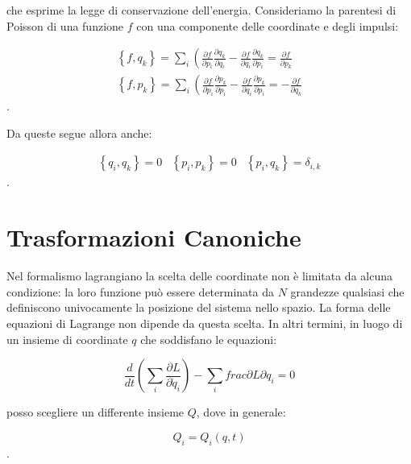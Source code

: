 \documentclass[a4paper,12pt,oneside]{book}
\begin{document}
che esprime la legge di conservazione dell'energia.
Consideriamo la parentesi di Poisson di una funzione $f$ con una componente delle coordinate e degli impulsi:

\begin{equation}
\begin{matrix}
\left\lbrace f,q_k \right\rbrace = \sum_i \left( \frac{\partial f}{\partial p_i} \frac{\partial q_k}{\partial q_i} - \frac{\partial f}{\partial q_i}\frac{\partial q_k}{\partial p_i} = \frac{\partial f}{\partial p_k} \\


\left\lbrace f,p_k \right\rbrace = \sum_i \left( \frac{\partial f}{\partial p_i} \frac{\partial p_k}{\partial p_i} - \frac{\partial f}{\partial q_i}\frac{\partial p_k}{\partial p_i} = - \frac{\partial f}{\partial q_k}
\end{matrix}
\end{equation}.

Da queste segue allora anche:

\begin{equation}
\begin{matrix}
\left\lbrace q_i,q_k \right\rbrace =0 &  \left\lbrace p_i,p_k \right\rbrace =0 & \left\lbrace p_i,q_k \right\rbrace = \delta_{i,k}
\end{matrix}
\end{equation}.

\section{Trasformazioni Canoniche}

Nel formalismo lagrangiano la scelta delle coordinate non \`e limitata da alcuna condizione: la loro funzione pu\`o essere determinata da $N$ grandezze qualsiasi che definiscono univocamente la posizione del sistema nello spazio. La forma delle equazioni di Lagrange non dipende da questa scelta. In altri termini, in luogo di un insieme di coordinate $q$ che soddisfano le equazioni:

\begin{equation}
\frac{d}{dt}  \left( \sum_i\frac{\partial L}{\partial \dot{q}_i} \right) - \sum_i frac{\partial L}{\partial q_i} = 0
\end{equation}

posso scegliere un differente insieme $Q$, dove in generale:

\begin{equation}
Q_i = Q_i(q,t)
\label{Q_i}
\end{equation}.
\end{document}
